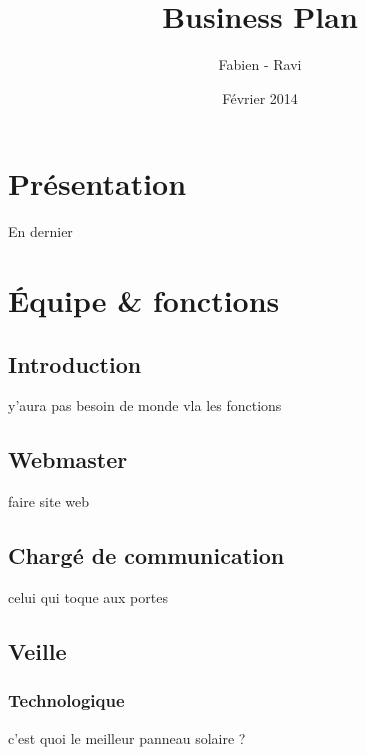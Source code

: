 \documentclass[10pt]{article}
\title{\textbf{Business Plan}\\{ {\small {\bsc {- Res Publica -}}}}}
\author{Fabien \bsc{Buisson} - Ravi \bsc{Pachy}}
\date{Février 2014}
\begin{document}
\renewcommand{\contentsname}{Sommaire}
\maketitle
\thispagestyle{empty}

\newpage

\tableofcontents

\newpage
\pagestyle{headings}

\section{Présentation}
\label{sec:presentation}
En dernier



\section{Équipe \& fonctions}
\label{sec:equipe_fonctions}

\subsection{Introduction}
\label{sub:equipe_intro}
y'aura pas besoin de monde
vla les fonctions

\subsection{Webmaster}
\label{sec:webmaster}
faire site web


\subsection{Chargé de communication}
\label{sec:communication}
celui qui toque aux portes

\subsection{Veille}
\label{sec:}
\subsubsection{Technologique}
\label{ssub:}
c'est quoi le meilleur panneau solaire ?
\end{document}
